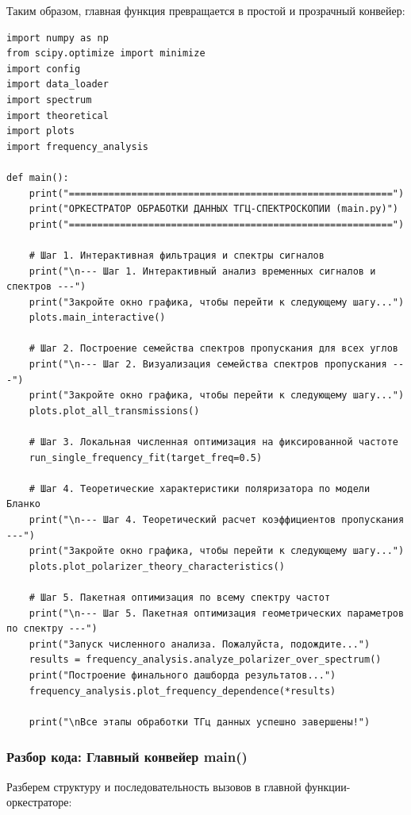 Таким образом, главная функция  превращается в простой и прозрачный конвейер:
\begin{verbatim}
import numpy as np
from scipy.optimize import minimize
import config
import data_loader
import spectrum
import theoretical
import plots
import frequency_analysis

def main():
    print("=========================================================")
    print("ОРКЕСТРАТОР ОБРАБОТКИ ДАННЫХ ТГЦ-СПЕКТРОСКОПИИ (main.py)")
    print("=========================================================")
    
    # Шаг 1. Интерактивная фильтрация и спектры сигналов
    print("\n--- Шаг 1. Интерактивный анализ временных сигналов и спектров ---")
    print("Закройте окно графика, чтобы перейти к следующему шагу...")
    plots.main_interactive()
    
    # Шаг 2. Построение семейства спектров пропускания для всех углов
    print("\n--- Шаг 2. Визуализация семейства спектров пропускания ---")
    print("Закройте окно графика, чтобы перейти к следующему шагу...")
    plots.plot_all_transmissions()
    
    # Шаг 3. Локальная численная оптимизация на фиксированной частоте
    run_single_frequency_fit(target_freq=0.5)
    
    # Шаг 4. Теоретические характеристики поляризатора по модели Бланко
    print("\n--- Шаг 4. Теоретический расчет коэффициентов пропускания ---")
    print("Закройте окно графика, чтобы перейти к следующему шагу...")
    plots.plot_polarizer_theory_characteristics()
    
    # Шаг 5. Пакетная оптимизация по всему спектру частот
    print("\n--- Шаг 5. Пакетная оптимизация геометрических параметров по спектру ---")
    print("Запуск численного анализа. Пожалуйста, подождите...")
    results = frequency_analysis.analyze_polarizer_over_spectrum()
    print("Построение финального дашборда результатов...")
    frequency_analysis.plot_frequency_dependence(*results)
    
    print("\nВсе этапы обработки ТГц данных успешно завершены!")
\end{verbatim}

\subsubsection{Разбор кода: Главный конвейер main()}

Разберем структуру и последовательность вызовов в главной функции-оркестраторе:

